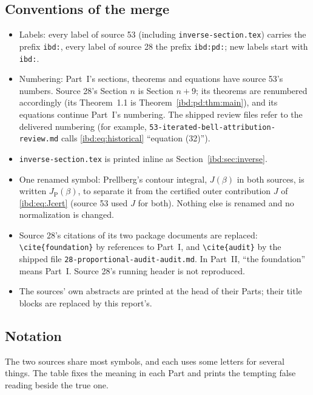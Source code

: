\documentclass[11pt,letterpaper]{article}
\theoremstyle{remark}\newtheorem{remark}[theorem]{Remark}
\newcommand{\JP}{J_{\mathrm P}}
\begin{document}
\subsection*{Conventions of the merge}
\label{ibd:guide:conventions}
\begin{itemize}
\item Labels: every label of source 53 (including \texttt{inverse-section.tex}) carries the prefix \texttt{ibd:}, every label of source 28 the prefix \texttt{ibd:pd:}; new labels start with \texttt{ibd:}.
\item Numbering: Part~I's sections, theorems and equations have source 53's numbers. Source 28's Section $n$ is Section $n+9$; its theorems are renumbered accordingly (its Theorem~1.1 is Theorem~\ref{ibd:pd:thm:main}), and its equations continue Part~I's numbering. The shipped review files refer to the delivered numbering (for example, \texttt{53-iterated-bell-attribution-review.md} calls \eqref{ibd:eq:historical} ``equation (32)'').
\item \texttt{inverse-section.tex} is printed inline as Section~\ref{ibd:sec:inverse}.
\item One renamed symbol: Prellberg's contour integral, $J(\beta)$ in both sources, is written $\JP(\beta)$, to separate it from the certified outer contribution $J$ of \eqref{ibd:eq:Jcert} (source 53 used $J$ for both). Nothing else is renamed and no normalization is changed.
\item Source 28's citations of its two package documents are replaced: \verb|\cite{foundation}| by references to Part~I, and \verb|\cite{audit}| by the shipped file \texttt{28-proportional-audit-audit.md}. In Part~II, ``the foundation'' means Part~I. Source 28's running header is not reproduced.
\item The sources' own abstracts are printed at the head of their Parts; their title blocks are replaced by this report's.
\end{itemize}

\subsection*{Notation}
\label{ibd:guide:notation}
The two sources share most symbols, and each uses some letters for several things. The table fixes the meaning in each Part and prints the tempting false reading beside the true one.
\end{document}
